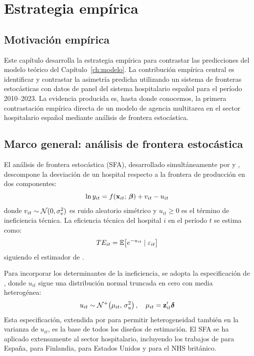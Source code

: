 ﻿\chapter{Estrategia empírica}
\label{ch:estrategia}

\section{Motivación empírica}

Este capítulo desarrolla la estrategia empírica para contrastar las predicciones del modelo teórico del Capítulo~\ref{ch:modelo}. La contribución empírica central es identificar y contrastar la asimetría predicha utilizando un sistema de fronteras estocásticas con datos de panel del sistema hospitalario español para el período 2010--2023. La evidencia producida es, hasta donde conocemos, la primera contrastación empírica directa de un modelo de agencia multitarea en el sector hospitalario español mediante análisis de frontera estocástica.

\section{Marco general: análisis de frontera estocástica}

El análisis de frontera estocástica (SFA), desarrollado simultáneamente por \citet{aigner1977} y \citet{meeusen1977}, descompone la desviación de un hospital respecto a la frontera de producción en dos componentes:
\begin{equation}
  \ln y_{it} = f(\mathbf{x}_{it};\,\boldsymbol{\beta}) + v_{it} - u_{it}
  \label{eq:sfa_base}
\end{equation}
donde $v_{it} \sim \mathcal{N}(0, \sigma^2_v)$ es ruido aleatorio simétrico y $u_{it} \geq 0$ es el término de ineficiencia técnica. La eficiencia técnica del hospital $i$ en el período $t$ se estima como:
\begin{equation}
  TE_{it} = \mathbb{E}\!\left[e^{-u_{it}} \mid \varepsilon_{it}\right]
  \label{eq:te}
\end{equation}
siguiendo el estimador de \citet{jondrow1982}.

Para incorporar los determinantes de la ineficiencia, se adopta la especificación de \citet{battese1995}, donde $u_{it}$ sigue una distribución normal truncada en cero con media heterogénea:
\begin{equation}
  u_{it} \sim \mathcal{N}^+\!\left(\mu_{it},\, \sigma^2_u\right), \quad \mu_{it} = \mathbf{z}_{it}'\boldsymbol{\delta}
  \label{eq:bc95}
\end{equation}
Esta especificación, extendida por \citet{wang2002} para permitir heterogeneidad también en la varianza de $u_{it}$, es la base de todos los diseños de estimación. El SFA se ha aplicado extensamente al sector hospitalario, incluyendo los trabajos de \citet{puigjunoy2000} para España, \citet{linna1998} para Finlandia, \citet{rosko2008} para Estados Unidos y \citet{street2003} para el NHS británico.

